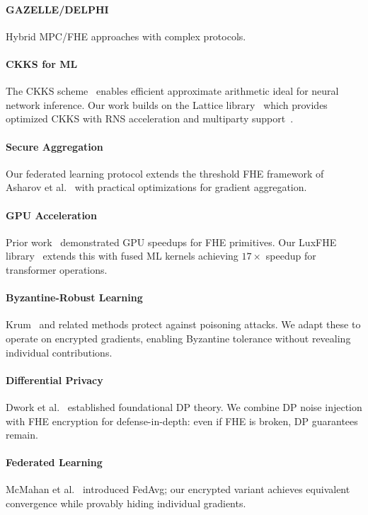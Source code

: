 \documentclass{../shared/luxfhe}
\begin{document}
\paragraph{GAZELLE/DELPHI} Hybrid MPC/FHE approaches with complex protocols.

\paragraph{CKKS for ML} The CKKS scheme~\cite{ckks,ckks-rns} enables efficient approximate arithmetic ideal for neural network inference. Our work builds on the Lattice library~\cite{lattice} which provides optimized CKKS with RNS acceleration and multiparty support~\cite{mhe-rlwe}.

\paragraph{Secure Aggregation} Our federated learning protocol extends the threshold FHE framework of Asharov et al.~\cite{threshold-fhe-mpc} with practical optimizations for gradient aggregation.

\paragraph{GPU Acceleration} Prior work~\cite{gpu-fhe} demonstrated GPU speedups for FHE primitives. Our LuxFHE library~\cite{luxcpp-fhe} extends this with fused ML kernels achieving $17\times$ speedup for transformer operations.

\paragraph{Byzantine-Robust Learning} Krum~\cite{krum} and related methods protect against poisoning attacks. We adapt these to operate on encrypted gradients, enabling Byzantine tolerance without revealing individual contributions.

\paragraph{Differential Privacy} Dwork et al.~\cite{dwork-dp} established foundational DP theory. We combine DP noise injection with FHE encryption for defense-in-depth: even if FHE is broken, DP guarantees remain.

\paragraph{Federated Learning} McMahan et al.~\cite{fedavg} introduced FedAvg; our encrypted variant achieves equivalent convergence while provably hiding individual gradients.
\end{document}
